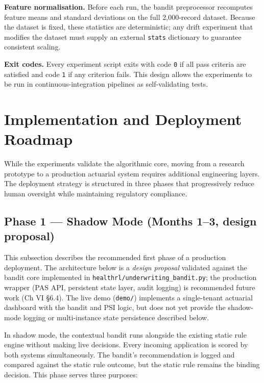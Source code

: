 \textbf{Feature normalisation.} Before each run, the bandit preprocessor recomputes feature means and standard deviations on the full 2,000-record dataset. Because the dataset is fixed, these statistics are deterministic; any drift experiment that modifies the dataset must supply an external \texttt{stats} dictionary to guarantee consistent scaling.

\textbf{Exit codes.} Every experiment script exits with code \texttt{0} if all pass criteria are satisfied and code \texttt{1} if any criterion fails. This design allows the experiments to be run in continuous-integration pipelines as self-validating tests.

\section{Implementation and Deployment Roadmap}\label{implementation-and-deployment-roadmap}

While the experiments validate the algorithmic core, moving from a research prototype to a production actuarial system requires additional engineering layers. The deployment strategy is structured in three phases that progressively reduce human oversight while maintaining regulatory compliance.

\subsection{Phase 1 --- Shadow Mode (Months 1--3, design proposal)}\label{phase-1-shadow-mode-months-13-design-proposal}

This subsection describes the recommended first phase of a production deployment. The architecture below is a \emph{design proposal} validated against the bandit core implemented in \texttt{healthrl/underwriting\_bandit.py}; the production wrapper (PAS API, persistent state layer, audit logging) is recommended future work (Ch VI §6.4). The live demo (\texttt{demo/}) implements a single-tenant actuarial dashboard with the bandit and PSI logic, but does not yet provide the shadow-mode logging or multi-instance state persistence described below.

In shadow mode, the contextual bandit runs alongside the existing static rule engine without making live decisions. Every incoming application is scored by both systems simultaneously. The bandit's recommendation is logged and compared against the static rule outcome, but the static rule remains the binding decision. This phase serves three purposes:

